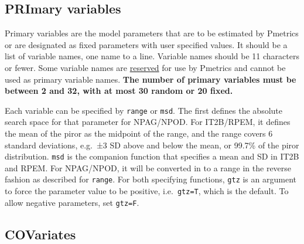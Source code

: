 \documentclass[
]{book}
\newenvironment{Shaded}{\begin{snugshade}}{\end{snugshade}}
\newcommand{\AttributeTok}[1]{\textcolor[rgb]{0.77,0.63,0.00}{#1}}
\newcommand{\DecValTok}[1]{\textcolor[rgb]{0.00,0.00,0.81}{#1}}
\newcommand{\FunctionTok}[1]{\textcolor[rgb]{0.00,0.00,0.00}{#1}}
\newcommand{\NormalTok}[1]{#1}
\newcommand{\OtherTok}[1]{\textcolor[rgb]{0.56,0.35,0.01}{#1}}
\newcommand{\SpecialCharTok}[1]{\textcolor[rgb]{0.00,0.00,0.00}{#1}}
\begin{document}
\hypertarget{priR6}{%
\subsection{PRImary variables}\label{priR6}}

Primary variables are the model parameters that are to be estimated by
Pmetrics or are designated as fixed parameters with user specified
values. It should be a list of variable names, one name to a line.
Variable names should be 11 characters or fewer. Some variable names are
\protect\hyperlink{reserved}{reserved} for use by Pmetrics and cannot be used as
primary variable names. \textbf{The number of primary variables must be
between 2 and 32, with at most 30 random or 20 fixed.}

Each variable can be specified by \texttt{range} or \texttt{msd}. The first defines the absolute search space for that parameter for NPAG/NPOD. For IT2B/RPEM, it defines the mean of the piror as the midpoint of the range, and the range covers 6 standard deviations, e.g.~±3 SD above and below the mean, or 99.7\% of the piror distribution. \texttt{msd} is the companion function that specifies a mean and SD in IT2B and RPEM. For NPAG/NPOD, it will be converted in to a range in the reverse fashion as described for \texttt{range}. For both specifying functions, \texttt{gtz} is an argument to force the parameter value to be positive, i.e.~\texttt{gtz=T}, which is the default. To allow negative parameters, set \texttt{gtz=F}.

\begin{Shaded}
\end{Shaded}

\hypertarget{covR6}{%
\subsection{COVariates}\label{covR6}}
\end{document}

